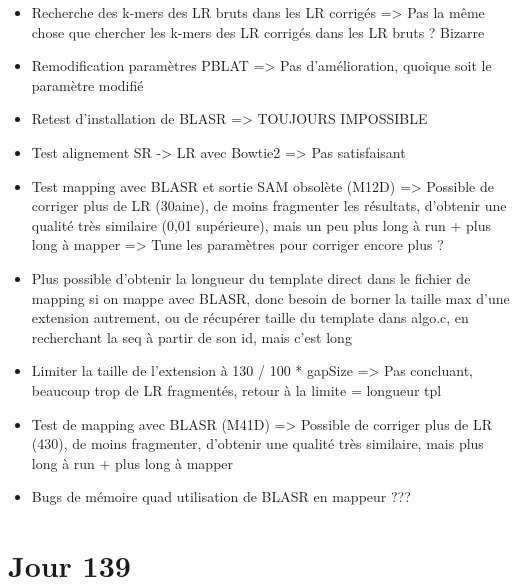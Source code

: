 \documentclass[12pt]{report}
\begin{document}
\begin{itemize}
	\item Recherche des k-mers des LR bruts dans les LR corrigés => Pas la même chose que chercher les k-mers des LR corrigés dans les 
		  LR bruts ? Bizarre
		  
	\item Remodification paramètres PBLAT => Pas d'amélioration, quoique soit le paramètre modifié
	
	\item Retest d'installation de BLASR => TOUJOURS IMPOSSIBLE
	
	\item Test alignement SR -> LR avec Bowtie2 => Pas satisfaisant
	
	\item Test mapping avec BLASR et sortie SAM obsolète (M12D) => Possible de corriger plus de LR (30aine), de moins fragmenter les résultats,
		  d'obtenir une qualité très similaire (0,01 supérieure), mais un peu plus long à run + plus long à mapper
		  => Tune les paramètres pour corriger encore plus ?
		  
	\item Plus possible d'obtenir la longueur du template direct dans le fichier de mapping si on mappe avec BLASR, donc besoin de borner
		  la taille max d'une extension autrement, ou de récupérer taille du template dans algo.c, en recherchant la seq à partir de son id,
		  mais c'est long
		  
	 \item Limiter la taille de l'extension à 130 / 100 * gapSize => Pas concluant, beaucoup trop de LR fragmentés, retour à la limite = longueur tpl
	 
	 \item Test de mapping avec BLASR (M41D) => Possible de corriger plus de LR (430), de moins fragmenter, d'obtenir une qualité très similaire,
	 	   mais plus long à run + plus long à mapper
	 
	 \item Bugs de mémoire quad utilisation de BLASR en mappeur ???
\end{itemize}

\section{Jour 139}
\end{document}
